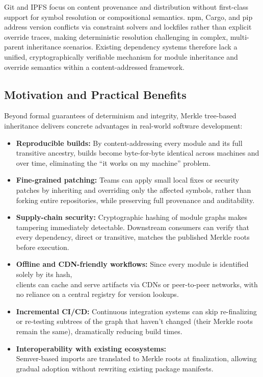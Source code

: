 \documentclass[sigplan,screen]{acmart}
\begin{document}
Git and IPFS focus on content provenance and distribution without first-class support for symbol resolution or compositional semantics. npm, Cargo, and pip address version conflicts via constraint solvers and lockfiles rather than explicit override traces, making deterministic resolution challenging in complex, multi-parent inheritance scenarios. Existing dependency systems therefore lack a unified, cryptographically verifiable mechanism for module inheritance and override semantics within a content-addressed framework.

\subsection{Motivation and Practical Benefits}

Beyond formal guarantees of determinism and integrity, Merkle tree-based inheritance delivers concrete advantages in real-world software development:

\begin{itemize}
  \item \textbf{Reproducible builds:} By content-addressing every module and its full transitive ancestry, builds become byte-for-byte identical across machines and over time, eliminating the “it works on my machine” problem.
  \item \textbf{Fine-grained patching:} Teams can apply small local fixes or security patches by inheriting and overriding only the affected symbols, rather than forking entire repositories, while preserving full provenance and auditability.
  \item \textbf{Supply-chain security:} Cryptographic hashing of module graphs makes tampering immediately detectable.  Downstream consumers can verify that every dependency, direct or transitive, matches the published Merkle roots before execution.
  \item \textbf{Offline and CDN-friendly workflows:} Since every module is identified solely by its hash, \\clients can cache and serve artifacts via CDNs or peer-to-peer networks, with no reliance on a central registry for version lookups.
  \item \textbf{Incremental CI/CD:} Continuous integration systems can skip re-finalizing or re-testing subtrees of the graph that haven't changed (their Merkle roots remain the same), dramatically reducing build times.
  \item \textbf{Interoperability with existing ecosystems:} \\Semver-based imports are translated to Merkle roots at finalization, allowing gradual adoption without rewriting existing package manifests.
\end{itemize}
\end{document}
